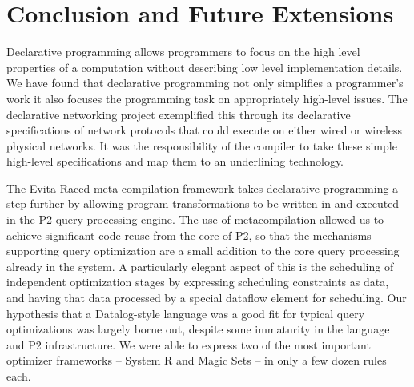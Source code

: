 \chapter[Conclusion and Future Extensions]{Conclusion and Future Extensions}
\label{ch:conclusion}


Declarative programming allows programmers to focus on the high level properties of a
computation without describing low level implementation details. We have found that 
declarative programming not only simplifies a programmer's work it also focuses the
programming task on appropriately high-level issues. The declarative networking project
exemplified this through its declarative specifications of network protocols that could 
execute on either wired or wireless physical networks. It was the responsibility of the
compiler to take these simple high-level specifications and map them to an underlining
technology. 

The Evita Raced meta-compilation framework takes declarative programming a step further
by allowing \OVERLOG program transformations to be written in \OVERLOG and executed 
in the P2 query processing engine. The use of metacompilation allowed us to achieve significant 
code reuse from the core of P2, so that the mechanisms supporting query optimization are a small 
addition to the core query processing already in the system.  A particularly elegant aspect of this is the 
scheduling of independent optimization stages by expressing scheduling constraints as data, and having 
that data processed by a special dataflow element for scheduling.  Our hypothesis that a 
Datalog-style language was a good fit for typical query optimizations was largely borne out, 
despite some immaturity in the \OVERLOG language and P2 infrastructure. We were able to 
express two of the most important optimizer frameworks -- System R and Magic Sets -- in only 
a few dozen rules each. 


